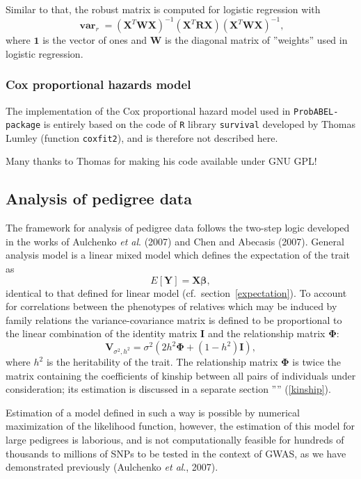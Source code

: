 \documentclass[12pt,a4paper]{article}
\DeclareMathOperator{\var}{\mathbf{var}}
\newcommand{\PA}{\texttt{ProbABEL-package}}
\begin{document}
Similar to that, the robust matrix is computed for logistic regression with
$$
\var_r = (\mathbf{X}^T \mathbf{W} \mathbf{X})^{-1} (\mathbf{X}^T\mathbf{R}\mathbf{X})
(\mathbf{X}^T \mathbf{W} \mathbf{X})^{-1},
$$
where $\mathbf{1}$ is the vector of ones and $\mathbf{W}$ is the diagonal matrix
of ''weights'' used in logistic regression.


\subsubsection{Cox proportional hazards model}
The implementation of the Cox proportional hazard model used
in \PA{} is entirely based on the code of \texttt{R}
library \texttt{survival} developed by Thomas Lumley
(function \texttt{coxfit2}), and is therefore not described here.

Many thanks to Thomas for making his code available under GNU GPL!

\subsection{Analysis of pedigree data}
The framework for analysis of pedigree data follows the two-step logic
developed in the works of Aulchenko \emph{et al}. (2007) and Chen and
Abecasis (2007). General analysis model is a linear mixed model which
defines the expectation of the trait as
$$
E[\mathbf{Y}] = \mathbf{X} \mathbf{\beta},
$$
identical to that defined for linear model (cf.~section~\ref{expectation}).
To account for correlations between the phenotypes of
relatives which may be induced by family relations the variance-covariance
matrix is defined to be proportional to the linear combination of the
identity matrix $\mathbf{I}$ and the relationship matrix $\mathbf{\Phi}$:
$$
\mathbf{V}_{\sigma^2,h^2} = \sigma^2 \left( 2 h^2 \mathbf{\Phi} + (1-h^2)
\mathbf{I} \right),
$$
where $h^2$ is the heritability of the trait.
The relationship matrix $\mathbf{\Phi}$ is twice the matrix containing
the coefficients of kinship between all pairs of individuals under consideration;
its estimation is discussed in a separate section '''' (\ref{kinship}).

Estimation of a model defined in such a way is possible by numerical
maximization of the likelihood function, however, the estimation of
this model for large pedigrees is laborious, and is not
computationally feasible for hundreds of thousands to millions of SNPs
to be tested in the context of GWAS, as we have demonstrated
previously (Aulchenko \emph{et al}., 2007).
\end{document}

